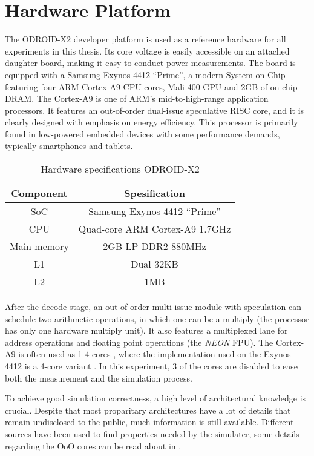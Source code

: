 \section{Hardware Platform}

The ODROID-X2 developer platform \cite{hardkernelodroidx2} is used as a
reference hardware for all experiments in this thesis. Its core voltage is
easily accessible on an attached daughter board, making it easy to conduct
power measurements. The board is equipped with a Samsung Exynos 4412 ``Prime'',
a modern System-on-Chip featuring four ARM Cortex-A9 CPU cores, Mali-400 GPU and
2GB of on-chip DRAM. The Cortex-A9 is one of ARM's mid-to-high-range application
processors. It features an out-of-order dual-issue speculative RISC core, and it
is clearly designed with emphasis on energy efficiency. This processor is
primarily found in low-powered embedded devices with some performance demands,
typically smartphones and tablets.

    \begin{table}
        \centering
        \begin{tabular}{|c|c|}
            \hline
            Component   & Spesification\\
            \hline
            SoC         & Samsung Exynos 4412 ``Prime'' \\
            CPU         & Quad-core ARM Cortex-A9 1.7GHz \\
            Main memory & 2GB LP-DDR2 880MHz \\
            L1          & Dual 32KB \\
            L2          & 1MB \\
            \hline
        \end{tabular}
        \caption{Hardware specifications ODROID-X2}
        \label{tab:hwspecx2}
    \end{table}

After the decode stage, an out-of-order multi-issue module with speculation can
schedule two arithmetic operations, in which one can be a multiply (the
processor has only one hardware multiply unit). It also features a multiplexed lane
for address operations and floating point operations (the \emph{NEON} FPU). The
Cortex-A9 is often used as 1-4 cores \cite{armsite}, where the implementation
used on the Exynos 4412 is a 4-core variant \cite{somesite}. In this experiment,
3 of the cores are disabled to ease both the measurement and the simulation
process.

To achieve good simulation correctness, a high level of architectural knowledge
is crucial. Despite that most proparitary architectures have a lot of details
that remain undisclosed to the public, much information is still available.
Different sources have been used to find properties needed by the simulater,
some details regarding the OoO cores can be read about in
\cite{blem2013detailed}.
